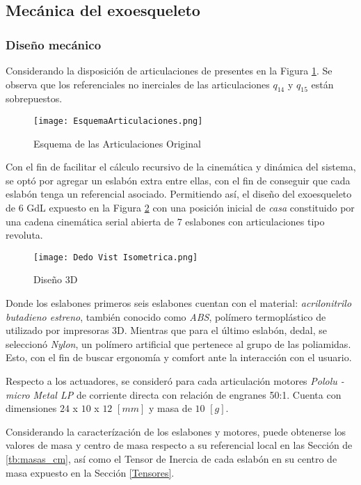 \subsection{Mecánica del exoesqueleto} 
    \subsubsection{Diseño mecánico}
        \noindent Considerando la disposición de articulaciones de \cite{hexotrac} presentes en la Figura \ref{fig:EsqArtOri}.
        Se observa que los referenciales no inerciales de las articulaciones $q_{14}$ y  $q_{15}$  están sobrepuestos.
        \begin{figure}[H]
            \centering
            \texttt{[image: EsquemaArticulaciones.png]} 
            \caption{Esquema de las Articulaciones Original}
            \label{fig:EsqArtOri}
        \end{figure}
        Con el fin de facilitar el cálculo recursivo de la cinemática y dinámica del sistema, se optó por agregar un 
        eslabón extra entre ellas, con el fin de conseguir que cada eslabón tenga un referencial asociado.
        Permitiendo así, el diseño del exoesqueleto de 6 GdL expuesto en la Figura \ref{fig:Diseno3D} con una
        posición inicial de \emph{casa} constituido por una cadena cinemática serial abierta de 7 eslabones 
        con articulaciones tipo revoluta. 

        \begin{figure}[H]
            \centering
            \texttt{[image: Dedo Vist Isometrica.png]} 
            \caption{Diseño 3D}
            \label{fig:Diseno3D}
        \end{figure}

        Donde los eslabones primeros seis eslabones cuentan con el material: \emph{acrilonitrilo butadieno estreno},
        también conocido como \emph{ABS}, polímero termoplástico de utilizado por impresoras 3D. Mientras que para 
        el último eslabón, dedal, se seleccionó \emph{Nylon}, un polímero artificial que 
        pertenece al grupo de las poliamidas. Esto, con el fin de buscar ergonomía y comfort
        ante la interacción con el usuario.

        Respecto a los actuadores, se consideró para cada articulación motores \emph{Pololu -  micro Metal LP} de corriente
        directa con relación de engranes 50:1. Cuenta con dimensiones $24$ x $10$ x $12$ $[mm]$ y masa de $10$ $[g]$.

        Considerando la caracterízación de los eslabones y motores, puede obtenerse los valores de masa y centro de masa
        respecto a su referencial local en las Sección de \ref{tb:masas_cm}, así como el Tensor de Inercia de cada eslabón
        en su centro de masa expuesto en la Sección \ref{Tensores}.



